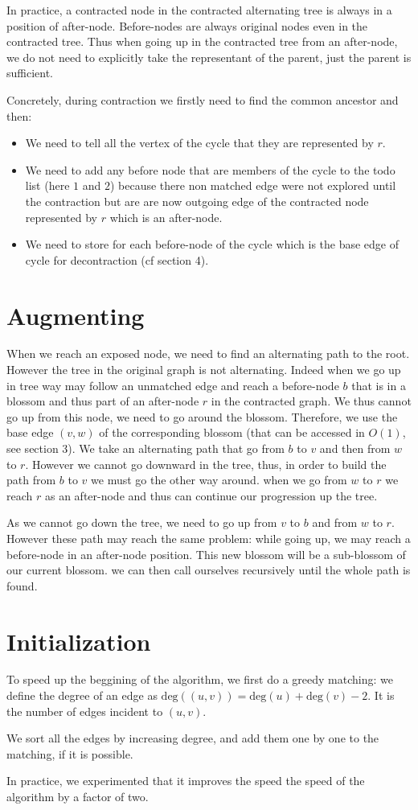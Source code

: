 \documentclass[a4paper,12pt]{article}
\renewcommand{\(}{\left(}
\renewcommand{\)}{\right)}
\begin{document}
In practice, a contracted node in the contracted alternating tree is always in a
position of after-node. Before-nodes are always original nodes even in the
contracted tree. Thus when going up in the contracted tree from an after-node,
we do not need to explicitly take the representant of the parent, just the
parent is sufficient.


Concretely, during contraction we firstly need to find the common ancestor and
then:
\begin{itemize}
\item We need to tell all the vertex of the cycle that they are represented by
  $r$.
\item We need to add any before node that are members of the cycle
to the todo list (here $1$ and $2$) because there non matched edge were not
explored until the contraction but are are now outgoing edge of the contracted
node represented by $r$ which is an after-node.
\item We need to store for each before-node of the cycle which is the base edge
  of cycle for decontraction (cf section 4).
\end{itemize}

\section{Augmenting}

When we reach an exposed node, we need to find an alternating path to the root.
However the tree in the original graph is not alternating. Indeed when we go up
in tree way may follow an unmatched edge and reach a before-node $b$  that is in a
blossom and thus part of an after-node $r$ in the contracted graph. We thus cannot
go up from this node, we need to go around the blossom. Therefore, we use the
base edge $(v,w)$ of the corresponding blossom (that can be accessed in $O(1)$, see
section 3). We take an alternating path that go from $b$ to $v$ and then from
$w$ to $r$. However we cannot go downward in the tree, thus, in order to build
the path from $b$ to $v$ we must go the other way around. when we go from $w$ to
$r$ we reach $r$ as an after-node and thus can continue our progression up the tree.

As we cannot go down the tree, we need to go up from $v$ to $b$ and from $w$ to
$r$. However these path may reach the same problem: while going up, we may reach
a before-node in an after-node position. This new blossom will be a sub-blossom
of our current blossom. we can then call ourselves recursively until the whole
path is found.

\section{Initialization}

To speed up the beggining of the algorithm, we first do a greedy matching:
we define the degree of an edge as
$\mathrm{deg}((u, v)) = \mathrm{deg}(u) + \mathrm{deg}(v) - 2$.
It is the number of edges incident to $(u, v)$.

We sort all the edges by increasing degree, and add them one by one to the
matching, if it is possible.

In practice, we experimented that it improves the speed the speed of the
algorithm by a factor of two.
\end{document}
